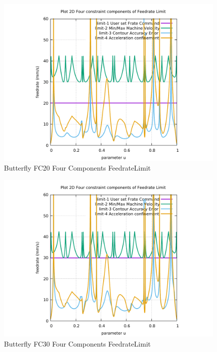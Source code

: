 \begin{figure}
	\caption     {Butterfly FC20 Four Components FeedrateLimit}
	\label{32-img-Butterfly-FC20-Four-Components-FeedrateLimit.pdf}
	\includegraphics[width=1.00\textwidth]{Chap4/appendix/app-Butterfly/plots/32-img-Butterfly-FC20-Four-Components-FeedrateLimit.pdf}
\end{figure}


\clearpage
\pagebreak

\begin{figure}
	\caption     {Butterfly FC30 Four Components FeedrateLimit}
	\label{33-img-Butterfly-FC30-Four-Components-FeedrateLimit.pdf}
	\includegraphics[width=1.00\textwidth]{Chap4/appendix/app-Butterfly/plots/33-img-Butterfly-FC30-Four-Components-FeedrateLimit.pdf}
\end{figure}


